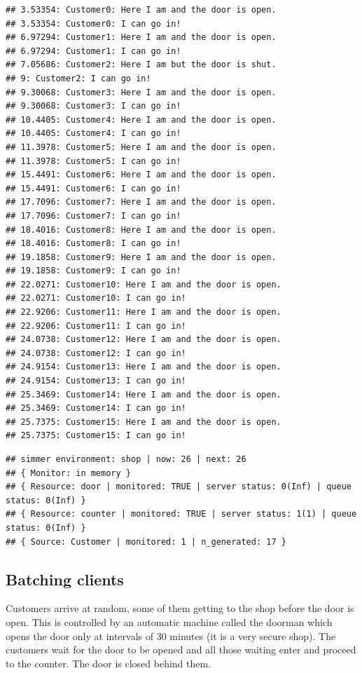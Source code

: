 \documentclass[
]{book}
\begin{document}
\begin{verbatim}
## 3.53354: Customer0: Here I am and the door is open.
## 3.53354: Customer0: I can go in!
## 6.97294: Customer1: Here I am and the door is open.
## 6.97294: Customer1: I can go in!
## 7.05686: Customer2: Here I am but the door is shut.
## 9: Customer2: I can go in!
## 9.30068: Customer3: Here I am and the door is open.
## 9.30068: Customer3: I can go in!
## 10.4405: Customer4: Here I am and the door is open.
## 10.4405: Customer4: I can go in!
## 11.3978: Customer5: Here I am and the door is open.
## 11.3978: Customer5: I can go in!
## 15.4491: Customer6: Here I am and the door is open.
## 15.4491: Customer6: I can go in!
## 17.7096: Customer7: Here I am and the door is open.
## 17.7096: Customer7: I can go in!
## 18.4016: Customer8: Here I am and the door is open.
## 18.4016: Customer8: I can go in!
## 19.1858: Customer9: Here I am and the door is open.
## 19.1858: Customer9: I can go in!
## 22.0271: Customer10: Here I am and the door is open.
## 22.0271: Customer10: I can go in!
## 22.9206: Customer11: Here I am and the door is open.
## 22.9206: Customer11: I can go in!
## 24.0738: Customer12: Here I am and the door is open.
## 24.0738: Customer12: I can go in!
## 24.9154: Customer13: Here I am and the door is open.
## 24.9154: Customer13: I can go in!
## 25.3469: Customer14: Here I am and the door is open.
## 25.3469: Customer14: I can go in!
## 25.7375: Customer15: Here I am and the door is open.
## 25.7375: Customer15: I can go in!
\end{verbatim}

\begin{verbatim}
## simmer environment: shop | now: 26 | next: 26
## { Monitor: in memory }
## { Resource: door | monitored: TRUE | server status: 0(Inf) | queue status: 0(Inf) }
## { Resource: counter | monitored: TRUE | server status: 1(1) | queue status: 0(Inf) }
## { Source: Customer | monitored: 1 | n_generated: 17 }
\end{verbatim}

\hypertarget{batching-clients}{%
\subsection{Batching clients}\label{batching-clients}}

Customers arrive at random, some of them getting to the shop before the door is open. This is controlled by an automatic machine called the doorman which opens the door only at intervals of 30 minutes (it is a very secure shop). The customers wait for the door to be opened and all those waiting enter and proceed to the counter. The door is closed behind them.
\end{document}
